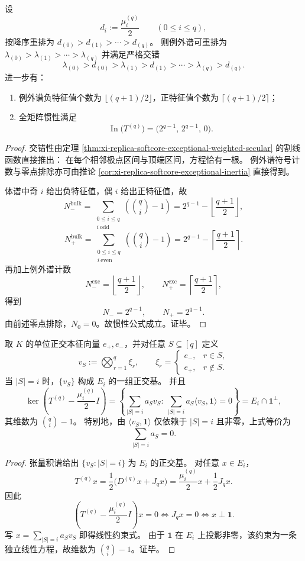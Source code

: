 \begin{theorem}[严格交错与全矩阵惯性平衡]\label{thm:xi-replica-softcore-full-inertia-balance}
设
\[
d_i:=\frac{\mu_i^{(q)}}2\qquad(0\le i\le q),
\]
按降序重排为
\(
d_{(0)}>d_{(1)}>\cdots>d_{(q)}
\)。
则例外谱可重排为
\(
\lambda_{(0)}>\lambda_{(1)}>\cdots>\lambda_{(q)}
\)
并满足严格交错
\[
\lambda_{(0)}>d_{(0)}>\lambda_{(1)}>d_{(1)}>\cdots>\lambda_{(q)}>d_{(q)}.
\]
进一步有：
\begin{enumerate}
  \item 例外谱负特征值个数为 \(\lfloor(q+1)/2\rfloor\)，正特征值个数为 \(\lceil(q+1)/2\rceil\)；
  \item 全矩阵惯性满足
  \[
  \operatorname{In}\!\bigl(T^{(q)}\bigr)=\bigl(2^{q-1},\,2^{q-1},\,0\bigr).
  \]
\end{enumerate}
\end{theorem}
\begin{proof}
交错性由定理 \ref{thm:xi-replica-softcore-exceptional-weighted-secular} 的割线函数直接推出：
在每个相邻极点区间与顶端区间，方程恰有一根。
例外谱符号计数与零点排除亦可由推论 \ref{cor:xi-replica-softcore-exceptional-inertia} 直接得到。

体谱中奇 \(i\) 给出负特征值，偶 \(i\) 给出正特征值，故
\[
N_-^{\mathrm{bulk}}
=
\sum_{\substack{0\le i\le q\\ i\ \mathrm{odd}}}
\left(\binom qi-1\right)
=
2^{q-1}-\left\lfloor\frac{q+1}{2}\right\rfloor,
\]
\[
N_+^{\mathrm{bulk}}
=
\sum_{\substack{0\le i\le q\\ i\ \mathrm{even}}}
\left(\binom qi-1\right)
=
2^{q-1}-\left\lceil\frac{q+1}{2}\right\rceil.
\]
再加上例外谱计数
\[
N_-^{\mathrm{exc}}=\left\lfloor\frac{q+1}{2}\right\rfloor,\qquad
N_+^{\mathrm{exc}}=\left\lceil\frac{q+1}{2}\right\rceil,
\]
得到
\[
N_-=2^{q-1},\qquad N_+=2^{q-1}.
\]
由前述零点排除，\(N_0=0\)。故惯性公式成立。证毕。
\end{proof}

\begin{proposition}[体谱特征空间的零和超平面方程]\label{prop:xi-replica-softcore-bulk-eigenspace-zero-sum-hyperplane}
取 \(K\) 的单位正交本征向量 \(e_+,e_-\)，并对任意 \(S\subseteq[q]\) 定义
\[
v_S:=\bigotimes_{r=1}^{q}\xi_r,\qquad
\xi_r=
\begin{cases}
e_-,&r\in S,\\
e_+,&r\notin S.
\end{cases}
\]
当 \(|S|=i\) 时，\(\{v_S\}\) 构成 \(E_i\) 的一组正交基。
并且
\[
\ker\!\left(T^{(q)}-\frac{\mu_i^{(q)}}2I\right)
=
\left\{
\sum_{|S|=i}a_Sv_S:\ 
\sum_{|S|=i}a_S\langle v_S,\mathbf1\rangle=0
\right\}
=E_i\cap\mathbf1^\perp,
\]
其维数为 \(\binom qi-1\)。
特别地，由 \(\langle v_S,\mathbf1\rangle\) 仅依赖于 \(|S|=i\) 且非零，上式等价为
\[
\sum_{|S|=i}a_S=0.
\]
\end{proposition}
\begin{proof}
张量积谱给出 \(\{v_S:|S|=i\}\) 为 \(E_i\) 的正交基。
对任意 \(x\in E_i\)，
\[
T^{(q)}x=\frac12\bigl(D^{(q)}x+J_qx\bigr)=\frac{\mu_i^{(q)}}2x+\frac12J_qx.
\]
因此
\[
\left(T^{(q)}-\frac{\mu_i^{(q)}}2I\right)x=0
\iff J_qx=0
\iff x\perp\mathbf1.
\]
写 \(x=\sum_{|S|=i}a_Sv_S\) 即得线性约束式。
由于 \(\mathbf1\) 在 \(E_i\) 上投影非零，该约束为一条独立线性方程，故维数为 \(\binom qi-1\)。证毕。
\end{proof}

